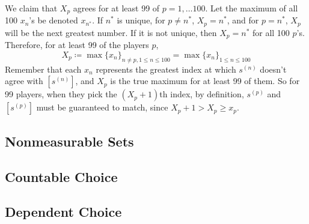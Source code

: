   We claim that $X_p$ agrees for at least 99 of $p = 1, \ldots 100$. Let the maximum of all 100 $x_n$'s be denoted $x_{n^\ast}$. If $n^\ast$ is unique, for $p \neq n^\ast$, $X_p = n^\ast$, and for $p = n^\ast$, $X_p$ will be the next greatest number. If it is not unique, then $X_p = n^\ast$ for all 100 $p$'s. Therefore, for at least 99 of the players $p$, 
  \begin{equation}
    X_p \coloneqq \max \{ x_n \}_{n \neq p, 1 \leq n \leq 100} = \max \{ x_n \}_{1 \leq n \leq 100} 
  \end{equation}
  Remember that each $x_n$ represents the greatest index at which $s^{(n)}$ doesn't agree with $[s^{(n)}]$, and $X_p$ is the true maximum for at least 99 of them. So for 99 players, when they pick the $(X_p + 1)$th index, by definition, $s^{(p)}$ and $[s^{(p)}]$ must be guaranteed to match, since $X_p + 1 > X_p \geq x_p$. 

\subsection{Nonmeasurable Sets}

\subsection{Countable Choice} 

\subsection{Dependent Choice}
